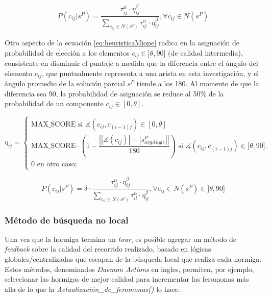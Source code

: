 \begin{equation}
P(c_{ij} | s^{P}) = \frac
        {\tau_{ij}^{\alpha} \cdot \eta_{ij}^{\beta}}
        {\sum\limits_{c_{ij}\in N(s^p)}{\tau_{ij}^{\alpha} \cdot \eta_{ij}^{\beta} } }, \forall c_{ij} \in N(s^{P})
\label{eq:antProbabilities}
\end{equation}

Otro aspecto de la ecuaci\'on \eqref{eq:heuristicaMiope} radica en la asignaci\'on de probabilidad de elecci\'on a los elementos $c_{ij} \in ]\theta, 90]$ (de calidad intermedia), consistente en disminuir el puntaje a medida que la diferencia entre el \'angulo del elemento $c_{ij}$, que puntualmente representa a una arista en esta investigaci\'on, y el \'angulo promedio de la soluci\'on parcial $s^P$ tiende a los 180\textdegree. Al momento de que la diferencia sea 90\textdegree, la probabilidad de asignaci\'on se reduce al 50\% de la probabilidad de un componente $c_{ij} \in [0, \theta]$.

\begin{equation}
    \eta_{ij} = 
        \begin{cases} 
        \text{MAX\_SCORE si } \measuredangle(c_{ij}, c_{(i-1)j}) \in [0, \theta]\\[3ex]
        
        \text{MAX\_SCORE} \cdot \left(1 - \dfrac{ \left| |\measuredangle(c_{ij})| - |s^{P}_{avgAngle}| \right|} {180} \right)  \text{ si } \measuredangle(c_{ij}, c_{(i-1)j}) \in ]\theta, 90].\\[3ex]
        
        \text{0 en otro caso;}
        \end{cases}
    \label{eq:heuristicaMiope}
\end{equation}

\begin{equation}
P(c_{ij} | s^{P}) = \delta \cdot \frac
        {\tau_{ij}^{\alpha} \cdot \eta_{ij}^{\beta}}
        {\sum\limits_{c_{il}\in N(s^p)}{\tau_{il}^{\alpha} \cdot \eta_{il}^{\beta} } }, \forall c_{ij} \in N(s^{P}) \in ]\theta, 90]
    \label{eq:antProbInterQua}
\end{equation}
    
\subsubsection{M\'etodo de b\'usqueda no local}
Una vez que la hormiga termina un {\it tour}, es posible agregar un m\'etodo de {\it feedback} sobre la calidad del recorrido realizado, basado en l\'ogicas globales/centralizadas que escapan de la b\'usqueda local que realiza cada hormiga. Estos m\'etodos, denominados {\it Daemon Actions} en ingles, permiten, por ejemplo, seleccionar las hormigas de mejor calidad para incrementar las feromonas m\'as alla de lo que la {\it Actualizaci\'on\_de\_feromonas()} lo hace. 

